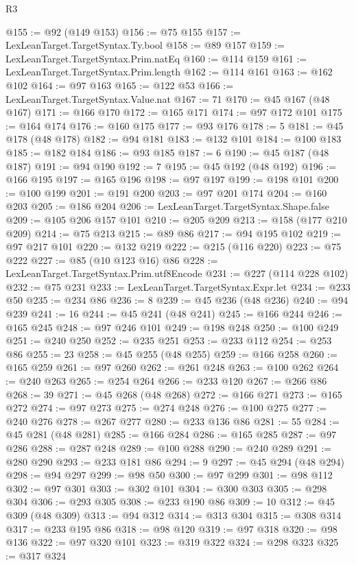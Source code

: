 \begin{lexlean}{R3}
\begin{coremodule}
@155 := @92 (@149 @153)
@156 := @75 @155
@157 := LexLeanTarget.TargetSyntax.Ty.bool
@158 := @89 @157
@159 := LexLeanTarget.TargetSyntax.Prim.natEq
@160 := @114 @159
@161 := LexLeanTarget.TargetSyntax.Prim.length
@162 := @114 @161
@163 := @162 @102
@164 := @97 @163
@165 := @122 @53
@166 := LexLeanTarget.TargetSyntax.Value.nat
@167 := 71
@170 := @45 @167 (@48 @167)
@171 := @166 @170
@172 := @165 @171
@174 := @97 @172 @101
@175 := @164 @174
@176 := @160 @175
@177 := @93 @176
@178 := 5
@181 := @45 @178 (@48 @178)
@182 := @94 @181
@183 := @132 @101
@184 := @100 @183
@185 := @182 @184
@186 := @93 @185
@187 := 6
@190 := @45 @187 (@48 @187)
@191 := @94 @190
@192 := 7
@195 := @45 @192 (@48 @192)
@196 := @166 @195
@197 := @165 @196
@198 := @97 @197
@199 := @198 @101
@200 := @100 @199
@201 := @191 @200
@203 := @97 @201 @174
@204 := @160 @203
@205 := @186 @204
@206 := LexLeanTarget.TargetSyntax.Shape.false
@209 := @105 @206 @157 @101
@210 := @205 @209
@213 := @158 (@177 @210 @209)
@214 := @75 @213
@215 := @89 @86
@217 := @94 @195 @102
@219 := @97 @217 @101
@220 := @132 @219
@222 := @215 (@116 @220)
@223 := @75 @222
@227 := @85 (@10 @123 @16) @86
@228 := LexLeanTarget.TargetSyntax.Prim.utf8Encode
@231 := @227 (@114 @228 @102)
@232 := @75 @231
@233 := LexLeanTarget.TargetSyntax.Expr.let
@234 := @233 @50
@235 := @234 @86
@236 := 8
@239 := @45 @236 (@48 @236)
@240 := @94 @239
@241 := 16
@244 := @45 @241 (@48 @241)
@245 := @166 @244
@246 := @165 @245
@248 := @97 @246 @101
@249 := @198 @248
@250 := @100 @249
@251 := @240 @250
@252 := @235 @251
@253 := @233 @112
@254 := @253 @86
@255 := 23
@258 := @45 @255 (@48 @255)
@259 := @166 @258
@260 := @165 @259
@261 := @97 @260
@262 := @261 @248
@263 := @100 @262
@264 := @240 @263
@265 := @254 @264
@266 := @233 @120
@267 := @266 @86
@268 := 39
@271 := @45 @268 (@48 @268)
@272 := @166 @271
@273 := @165 @272
@274 := @97 @273
@275 := @274 @248
@276 := @100 @275
@277 := @240 @276
@278 := @267 @277
@280 := @233 @136 @86
@281 := 55
@284 := @45 @281 (@48 @281)
@285 := @166 @284
@286 := @165 @285
@287 := @97 @286
@288 := @287 @248
@289 := @100 @288
@290 := @240 @289
@291 := @280 @290
@293 := @233 @181 @86
@294 := 9
@297 := @45 @294 (@48 @294)
@298 := @94 @297
@299 := @98 @50
@300 := @97 @299
@301 := @98 @112
@302 := @97 @301
@303 := @302 @101
@304 := @300 @303
@305 := @298 @304
@306 := @293 @305
@308 := @233 @190 @86
@309 := 10
@312 := @45 @309 (@48 @309)
@313 := @94 @312
@314 := @313 @304
@315 := @308 @314
@317 := @233 @195 @86
@318 := @98 @120
@319 := @97 @318
@320 := @98 @136
@322 := @97 @320 @101
@323 := @319 @322
@324 := @298 @323
@325 := @317 @324

\end{coremodule}
\end{lexlean}
